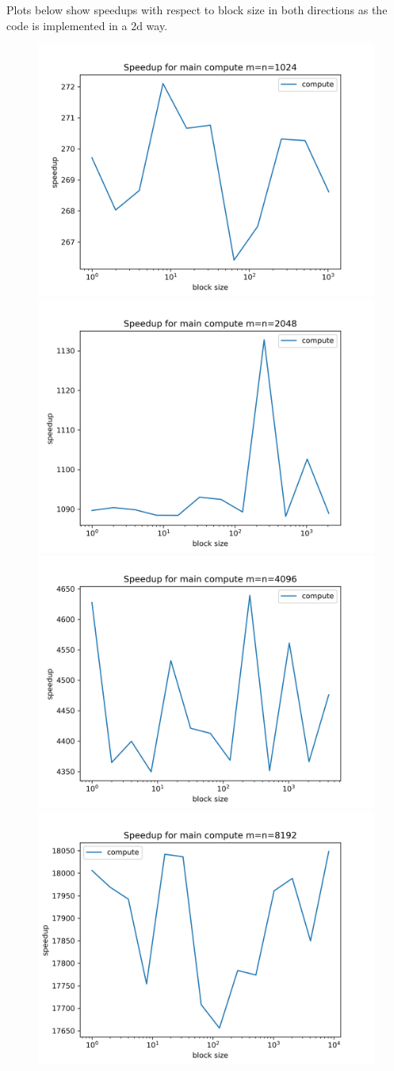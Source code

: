 \documentclass[a4paper]{article}
\begin{document}
	
	Plots below show speedups with respect to block size in both directions as 
	the code is implemented in a 2d way.
		
	\begin{figure}[h!]
		\centering
		\includegraphics[width=.5\linewidth]{../float/writeup/compute_plot_m1024.png}
		\includegraphics[width=.5\linewidth]{../float/writeup/compute_plot_m2048.png}
		\includegraphics[width=.5\linewidth]{../float/writeup/compute_plot_m4096.png}
		\includegraphics[width=.5\linewidth]{../float/writeup/compute_plot_m8192.png}
	\end{figure}
\end{document}
